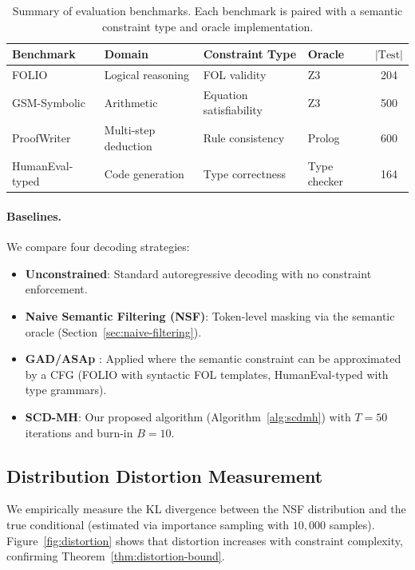 \documentclass[twoside,11pt]{article}
\begin{document}
\begin{table}[t]
\caption{Summary of evaluation benchmarks. Each benchmark is paired with a
semantic constraint type and oracle implementation.}
\label{tab:benchmarks}
\centering
\begin{tabular}{llllc}
\toprule
\textbf{Benchmark} & \textbf{Domain} & \textbf{Constraint Type} &
\textbf{Oracle} & \textbf{$|\text{Test}|$} \\
\midrule
FOLIO \citep{han2022folio} & Logical reasoning & FOL validity & Z3 &
204 \\
GSM-Symbolic \citep{mirzadeh2024gsm} & Arithmetic & Equation
satisfiability & Z3 & 500 \\
ProofWriter \citep{tafjord2021proofwriter} & Multi-step deduction &
Rule consistency & Prolog & 600 \\
HumanEval-typed \citep{chen2021evaluating} & Code generation & Type
correctness & Type checker & 164 \\
\bottomrule
\end{tabular}
\end{table}

\paragraph{Baselines.} We compare four decoding strategies:
\begin{itemize}
    \item \textbf{Unconstrained}: Standard autoregressive decoding with no
    constraint enforcement.
    \item \textbf{Naive Semantic Filtering (NSF)}: Token-level masking via
    the semantic oracle (Section~\ref{sec:naive-filtering}).
    \item \textbf{GAD/ASAp} \citep{ugare2024gad}: Applied where the
    semantic constraint can be approximated by a CFG (FOLIO with syntactic
    FOL templates, HumanEval-typed with type grammars).
    \item \textbf{SCD-MH}: Our proposed algorithm
    (Algorithm~\ref{alg:scdmh}) with $T=50$ iterations and burn-in $B=10$.
\end{itemize}

\subsection{Distribution Distortion Measurement}
\label{sec:exp-distortion}

We empirically measure the KL divergence between the NSF distribution and
the true conditional (estimated via importance sampling with $10{,}000$
samples). Figure~\ref{fig:distortion} shows that distortion increases with
constraint complexity, confirming Theorem~\ref{thm:distortion-bound}.
\end{document}
